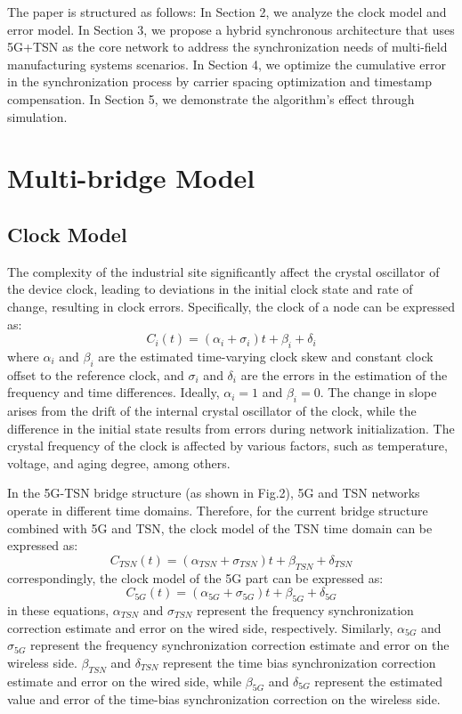 \documentclass[english]{cccconf}
\begin{document}
The paper is structured as follows: In Section 2, we analyze the clock model and error model. In Section 3, we propose a hybrid synchronous architecture that uses 5G+TSN as the core network to address the synchronization needs of multi-field manufacturing systems scenarios. In Section 4, we optimize the cumulative error in the synchronization process by carrier spacing optimization and timestamp compensation. In Section 5, we demonstrate the algorithm's effect through simulation.

\section{ Multi-bridge Model}

\subsection{Clock Model}
The complexity of the industrial site significantly affect the crystal oscillator of the device clock, leading to deviations in the initial clock state and rate of change, resulting in clock errors. Specifically, the clock of a node can be expressed as:
\begin{equation}
	C_i(t) = (\alpha _i+\sigma_i)t + \beta _i +\delta_i
\end{equation}
where $\alpha_i$ and $\beta_i$ are the estimated time-varying clock skew and constant clock offset to the reference clock, and $\sigma_i$ and $\delta_i$ are the errors in the estimation of the frequency and time differences. Ideally, $\alpha_i = 1$ and $\beta_i = 0$. The change in slope arises from the drift of the internal crystal oscillator of the clock, while the difference in the initial state results from errors during network initialization. The crystal frequency of the clock is affected by various factors, such as temperature, voltage, and aging degree, among others.

In the 5G-TSN bridge structure (as shown in Fig.2), 5G and TSN networks operate in different time domains. Therefore, for the current bridge structure combined with 5G and TSN, the clock model of the TSN time domain can be expressed as:
\begin{equation}
	C_{TSN}(t) = (\alpha_{TSN}+\sigma_{TSN})t + \beta _{TSN} +\delta_{TSN}
\end{equation}
 correspondingly, the clock model of the 5G part can be expressed as:
 \begin{equation}
 	C_{5G}(t) = (\alpha_{5G}+\sigma_{5G})t + \beta _{5G} +\delta_{5G}
 \end{equation}
in these equations, $\alpha_{TSN}$ and $\sigma_{TSN}$ represent the frequency synchronization correction estimate and error on the wired side, respectively. Similarly, $\alpha_{5G}$ and $\sigma_{5G}$ represent the frequency synchronization correction estimate and error on the wireless side. $\beta_{TSN}$ and $\delta_{TSN}$ represent the time bias synchronization correction estimate and error on the wired side, while $\beta_{5G}$ and $\delta_{5G}$ represent the estimated value and error of the time-bias synchronization correction on the wireless side. 
\end{document}
